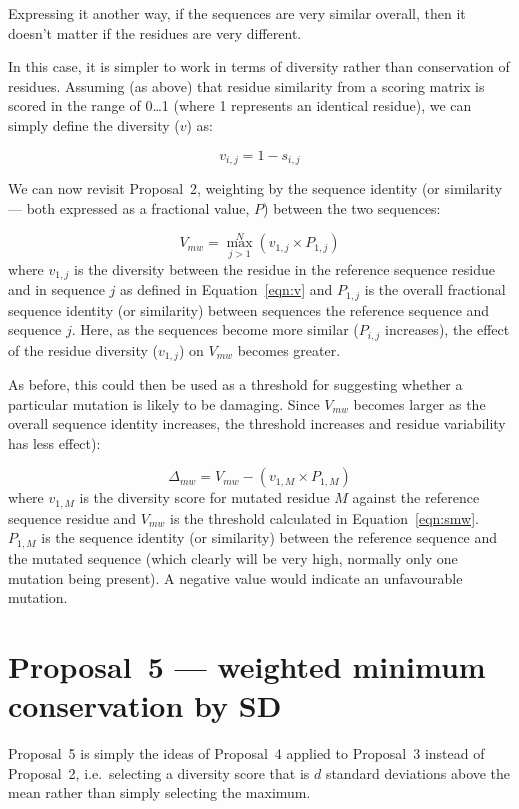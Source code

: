 \documentclass[a4paper]{article}
\begin{document}
Expressing it another way, if the sequences are very similar overall,
then it doesn't matter if the residues are very different.

In this case, it is simpler to work in terms of diversity rather than
conservation of residues. Assuming (as above) that residue similarity
from a scoring matrix is scored in the range of 0\ldots 1 (where 1
represents an identical residue), we can simply define the diversity
($v$) as:

\begin{equation}\label{eqn:v}
  v_{i,j} = 1 - s_{i,j}
\end{equation}


We can now revisit Proposal~2, weighting by the sequence identity (or
similarity --- both expressed as a fractional value, $P$) between the
two sequences:

%
%

\begin{equation} \label{eqn:smw}
  V_{mw} = \max_{j>1}^N(v_{1, j} \times P_{1,j})
\end{equation}
where $v_{1,j}$ is the diversity between the residue in the reference
sequence residue and in sequence $j$ as defined in
Equation~\ref{eqn:v} and $P_{1,j}$ is the overall fractional sequence
identity (or similarity) between sequences the reference sequence and
sequence $j$.  Here, as the sequences become more similar ($P_{i,j}$
increases), the effect of the residue diversity ($v_{1,j}$) on
$V_{mw}$ becomes greater.




As before, this could then be used as a threshold for suggesting
whether a particular mutation is likely to be damaging. Since $V_{mw}$
becomes larger as the overall sequence identity increases, the
threshold increases and residue variability has less effect):

\begin{equation}
  \Delta_{mw} = V_{mw} - (v_{1, M} \times P_{1, M}) 
\end{equation}
where $v_{1,M}$ is the diversity score for mutated residue $M$ against
the reference sequence residue and $V_{mw}$ is the threshold
calculated in Equation~\ref{eqn:smw}. $P_{1,M}$ is the sequence
identity (or similarity) between the reference sequence and the
mutated sequence (which clearly will be very high, normally only one
mutation being present). A negative value would indicate an
unfavourable mutation.


\section{Proposal~5 --- weighted minimum conservation by SD}
Proposal~5 is simply the ideas of Proposal~4 applied to Proposal~3
instead of Proposal~2, i.e.\ selecting a diversity score that is $d$ standard
deviations above the mean rather than simply selecting the
maximum.
\end{document}
